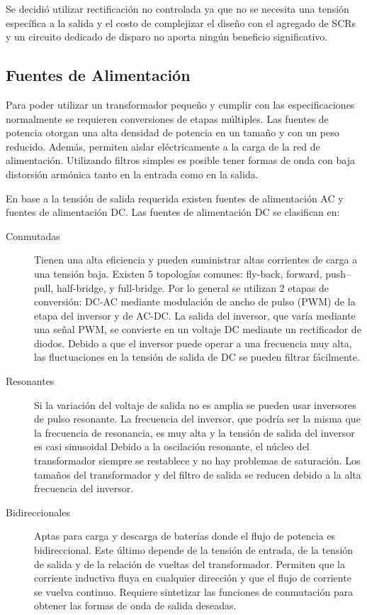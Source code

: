 Se decidió utilizar rectificación no controlada ya que no se necesita una tensión específica a la salida
y el costo de complejizar el diseño con el agregado de SCRs y un circuito dedicado de disparo no aporta ningún beneficio significativo.

\subsection{Fuentes de Alimentación}

Para poder utilizar un transformador pequeño y cumplir con las especificaciones normalmente se requieren conversiones de etapas múltiples.
Las fuentes de potencia otorgan una alta densidad de potencia en un tamaño y con un peso reducido.  
Además, permiten aislar eléctricamente a la carga de la red de alimentación. 
Utilizando filtros simples es posible tener formas de onda con baja distorsión armónica tanto en la entrada como en la salida. 

En base a la tensión de salida requerida existen fuentes de alimentación AC y fuentes de alimentación DC.
Las fuentes de alimentación DC se clasifican en:
\begin{description}
    \item[Conmutadas]
    Tienen una alta eficiencia y pueden suministrar altas corrientes de carga a una tensión baja.
    Existen 5 topologías comunes: fly-back, forward, push–pull, half-bridge, y full-bridge.
    Por lo general se utilizan 2 etapas de conversión: DC-AC mediante modulación de ancho de pulso (PWM) de la etapa del inversor y de AC-DC.
    La salida del inversor, que varía mediante una señal PWM, se convierte en un voltaje DC mediante un rectificador de diodos. 
    Debido a que el inversor puede operar a una frecuencia muy alta, las fluctuaciones en la tensión de salida de DC se pueden filtrar fácilmente.
    \item[Resonantes]
    Si la variación del voltaje de salida no es amplia se pueden usar inversores de pulso resonante. 
    La frecuencia del inversor, que podría ser la misma que la frecuencia de resonancia, es muy alta y la tensión de salida del inversor es casi sinusoidal 
    Debido a la oscilación resonante, el núcleo del transformador siempre se restablece y no hay problemas de saturación. 
    Los tamaños del transformador y del filtro de salida se reducen debido a la alta frecuencia del inversor.
    \item[Bidireccionales]
    Aptas para carga y descarga de baterías donde el flujo de potencia es bidireccional. 
    Este último depende de la tensión de entrada, de la tensión de salida y de la relación de vueltas del transformador. 
    Permiten que la corriente inductiva fluya en cualquier dirección y que el flujo de corriente se vuelva continuo.
    Requiere sintetizar las funciones de conmutación para obtener las formas de onda de salida deseadas.
\end{description}

